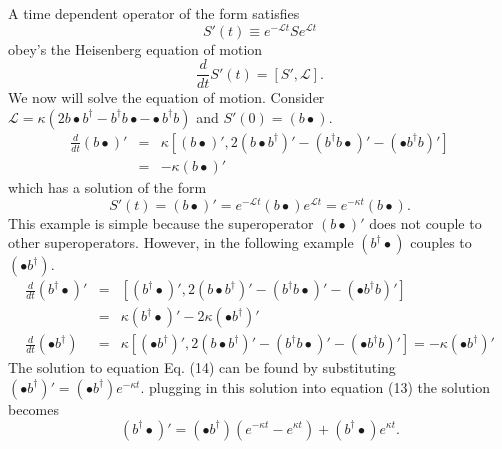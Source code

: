A time dependent operator of the form satisfies 
\begin{equation}
S'(t) \equiv e^{- \mathcal{L} t } S e^{ \mathcal{L} t }
\end{equation}
obey's the Heisenberg equation of motion
\begin{equation}
\frac{d}{d t } S'(t) = \left[ S', \mathcal{L} \right].
\end{equation}
We now will solve the equation of motion. Consider $\mathcal{L}= \kappa \left( 2 b \bullet b^{\dagger} - b^{\dagger} b \bullet - \bullet b^{\dagger} b \right)$ and $S'(0)=\left( b \bullet \right)$.
\begin{eqnarray}
\frac{d}{d t}\left( b \bullet \right)' & = & \kappa \left[ \left(b\bullet\right)', 2\left(b \bullet b^{\dagger} \right)' - \left( b^{\dagger} b \bullet \right)' - \left( \bullet b^{\dagger} b \right)' \right] \nonumber \\
& = & - \kappa \left( b \bullet \right)'
\end{eqnarray}
which has a solution of the form
\begin{equation}
S'(t) = (b \bullet)' = e^{- \mathcal{L} t } \left( b \bullet \right) e^{ \mathcal{L} t}= e^{ - \kappa t }\left( b \bullet \right).
\end{equation}
This example is simple because the superoperator $\left( b \bullet \right)'$ does not couple to other superoperators. However, in the following example $\left( b^{\dagger} \bullet \right)$ couples to $\left( \bullet b^{\dagger} \right)$.
\begin{eqnarray}
\frac{d}{d t } \left( b^{\dagger} \bullet \right)' & = & \left[ \left( b^{\dagger} \bullet \right)' , 2 \left( b \bullet b^{\dagger} \right)' - \left( b^{\dagger} b \bullet \right)' - \left( \bullet b^{\dagger} b \right)' \right] \nonumber \\
 & = & \kappa \left( b^{\dagger} \bullet \right)' - 2 \kappa \left( \bullet b^{\dagger} \right)' \\
\frac{d }{d t } \left( \bullet b^{\dagger} \right) & = & \kappa \left[ \left( \bullet b^{\dagger} \right)', 2 \left( b \bullet b^{\dagger} \right)' - \left( b^{\dagger} b \bullet \right)' - \left( \bullet b^{\dagger} b \right)' \right] = - \kappa \left( \bullet b^{\dagger} \right)' 
\end{eqnarray}
The solution to equation Eq. (14) can be found by substituting $\left( \bullet b^{\dagger} \right)'=\left( \bullet b^{\dagger}\right)e^{-\kappa t}$. plugging in this solution into equation (13) the solution becomes
\begin{equation}
\left( b^{\dagger} \bullet \right)' = \left( \bullet b^{\dagger} \right) \left( e^{-\kappa t} - e^{\kappa t} \right) + \left( b^{\dagger} \bullet \right) e^{\kappa t}.
\end{equation}


